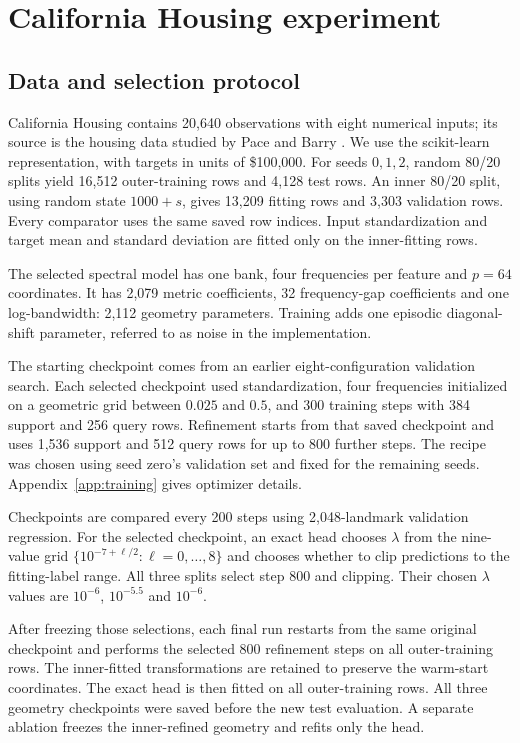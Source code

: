 \documentclass[11pt]{article}
\begin{document}
\section{California Housing experiment}
\subsection{Data and selection protocol}
California Housing contains 20,640 observations with eight numerical inputs; its source is the housing data studied by Pace and Barry \cite{pace1997}. We use the scikit-learn representation, with targets in units of \$100,000. For seeds $0,1,2$, random 80/20 splits yield 16,512 outer-training rows and 4,128 test rows. An inner 80/20 split, using random state $1000+s$, gives 13,209 fitting rows and 3,303 validation rows. Every comparator uses the same saved row indices. Input standardization and target mean and standard deviation are fitted only on the inner-fitting rows.

The selected spectral model has one bank, four frequencies per feature and $p=64$ coordinates. It has 2,079 metric coefficients, 32 frequency-gap coefficients and one log-bandwidth: 2,112 geometry parameters. Training adds one episodic diagonal-shift parameter, referred to as noise in the implementation.

The starting checkpoint comes from an earlier eight-configuration validation search. Each selected checkpoint used standardization, four frequencies initialized on a geometric grid between $0.025$ and $0.5$, and 300 training steps with 384 support and 256 query rows. Refinement starts from that saved checkpoint and uses 1,536 support and 512 query rows for up to 800 further steps. The recipe was chosen using seed zero's validation set and fixed for the remaining seeds. Appendix~\ref{app:training} gives optimizer details.

Checkpoints are compared every 200 steps using 2,048-landmark validation regression. For the selected checkpoint, an exact head chooses $\lambda$ from the nine-value grid $\{10^{-7+\ell/2}:\ell=0,\ldots,8\}$ and chooses whether to clip predictions to the fitting-label range. All three splits select step 800 and clipping. Their chosen $\lambda$ values are $10^{-6}$, $10^{-5.5}$ and $10^{-6}$.

After freezing those selections, each final run restarts from the same original checkpoint and performs the selected 800 refinement steps on all outer-training rows. The inner-fitted transformations are retained to preserve the warm-start coordinates. The exact head is then fitted on all outer-training rows. All three geometry checkpoints were saved before the new test evaluation. A separate ablation freezes the inner-refined geometry and refits only the head.
\end{document}
